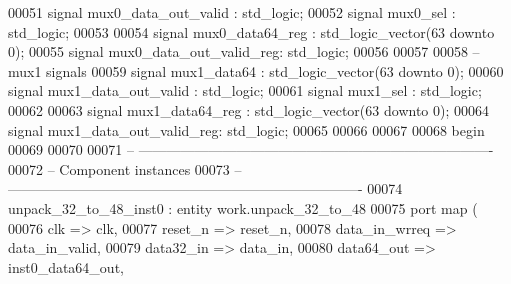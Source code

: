 \begin{DoxyCode}
00051 \textcolor{keywordflow}{signal} \textcolor{vhdlchar}{mux0_data_out_valid}      \textcolor{vhdlchar}{:} \textcolor{comment}{std\_logic};
00052 \textcolor{keywordflow}{signal} \textcolor{vhdlchar}{mux0_sel}                 \textcolor{vhdlchar}{:} \textcolor{comment}{std\_logic};
00053 
00054 \textcolor{keywordflow}{signal} \textcolor{vhdlchar}{mux0_data64_reg}          \textcolor{vhdlchar}{:} \textcolor{comment}{std\_logic\_vector}\textcolor{vhdlchar}{(}\textcolor{vhdllogic}{}\textcolor{vhdllogic}{63} \textcolor{keywordflow}{downto} \textcolor{vhdllogic}{}\textcolor{vhdllogic}{0}\textcolor{vhdlchar}{)};
00055 \textcolor{keywordflow}{signal} \textcolor{vhdlchar}{mux0_data_out_valid_reg}\textcolor{vhdlchar}{:} \textcolor{comment}{std\_logic};
00056 
00057 
00058 \textcolor{keyword}{--mux1 signals}
00059 \textcolor{keywordflow}{signal} \textcolor{vhdlchar}{mux1_data64}              \textcolor{vhdlchar}{:} \textcolor{comment}{std\_logic\_vector}\textcolor{vhdlchar}{(}\textcolor{vhdllogic}{}\textcolor{vhdllogic}{63} \textcolor{keywordflow}{downto} \textcolor{vhdllogic}{}\textcolor{vhdllogic}{0}\textcolor{vhdlchar}{)};
00060 \textcolor{keywordflow}{signal} \textcolor{vhdlchar}{mux1_data_out_valid}      \textcolor{vhdlchar}{:} \textcolor{comment}{std\_logic};
00061 \textcolor{keywordflow}{signal} \textcolor{vhdlchar}{mux1_sel}                 \textcolor{vhdlchar}{:} \textcolor{comment}{std\_logic};
00062 
00063 \textcolor{keywordflow}{signal} \textcolor{vhdlchar}{mux1_data64_reg}          \textcolor{vhdlchar}{:} \textcolor{comment}{std\_logic\_vector}\textcolor{vhdlchar}{(}\textcolor{vhdllogic}{}\textcolor{vhdllogic}{63} \textcolor{keywordflow}{downto} \textcolor{vhdllogic}{}\textcolor{vhdllogic}{0}\textcolor{vhdlchar}{)};
00064 \textcolor{keywordflow}{signal} \textcolor{vhdlchar}{mux1_data_out_valid_reg}\textcolor{vhdlchar}{:} \textcolor{comment}{std\_logic};
00065 
00066 
00067   
00068 \textcolor{vhdlkeyword}{begin}
00069 
00070 
00071 \textcolor{keyword}{-- ----------------------------------------------------------------------------}
00072 \textcolor{keyword}{-- Component instances}
00073 \textcolor{keyword}{-- ----------------------------------------------------------------------------}
00074 unpack\_32\_to\_48\_inst0 : \textcolor{keywordflow}{entity} work.unpack\_32\_to\_48 
00075 \textcolor{keywordflow}{port} \textcolor{keywordflow}{map} (
00076        clk              => clk,
00077       reset\_n           => reset_n,
00078         data\_in\_wrreq   => data_in_valid,
00079         data32\_in       => data_in,
00080         data64\_out      => inst0_data64_out,

\end{DoxyCode}
